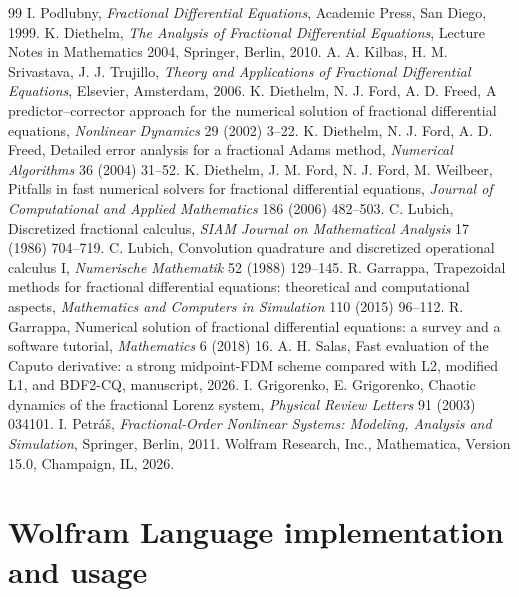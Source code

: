 \documentclass[11pt]{article}
\begin{document}
\begin{thebibliography}{99}
 I. Podlubny, \emph{Fractional Differential Equations}, Academic Press, San Diego, 1999.
 K. Diethelm, \emph{The Analysis of Fractional Differential Equations}, Lecture Notes in Mathematics 2004, Springer, Berlin, 2010.
 A. A. Kilbas, H. M. Srivastava, J. J. Trujillo, \emph{Theory and Applications of Fractional Differential Equations}, Elsevier, Amsterdam, 2006.
 K. Diethelm, N. J. Ford, A. D. Freed, A predictor--corrector approach for the numerical solution of fractional differential equations, \emph{Nonlinear Dynamics} 29 (2002) 3--22.
 K. Diethelm, N. J. Ford, A. D. Freed, Detailed error analysis for a fractional Adams method, \emph{Numerical Algorithms} 36 (2004) 31--52.
 K. Diethelm, J. M. Ford, N. J. Ford, M. Weilbeer, Pitfalls in fast numerical solvers for fractional differential equations, \emph{Journal of Computational and Applied Mathematics} 186 (2006) 482--503.
 C. Lubich, Discretized fractional calculus, \emph{SIAM Journal on Mathematical Analysis} 17 (1986) 704--719.
 C. Lubich, Convolution quadrature and discretized operational calculus I, \emph{Numerische Mathematik} 52 (1988) 129--145.
 R. Garrappa, Trapezoidal methods for fractional differential equations: theoretical and computational aspects, \emph{Mathematics and Computers in Simulation} 110 (2015) 96--112.
 R. Garrappa, Numerical solution of fractional differential equations: a survey and a software tutorial, \emph{Mathematics} 6 (2018) 16.
 A. H. Salas, Fast evaluation of the Caputo derivative: a strong midpoint-FDM scheme compared with L2, modified L1, and BDF2-CQ, manuscript, 2026.
 I. Grigorenko, E. Grigorenko, Chaotic dynamics of the fractional Lorenz system, \emph{Physical Review Letters} 91 (2003) 034101.
 I. Petr\'a\v{s}, \emph{Fractional-Order Nonlinear Systems: Modeling, Analysis and Simulation}, Springer, Berlin, 2011.
 Wolfram Research, Inc., Mathematica, Version 15.0, Champaign, IL, 2026.
\end{thebibliography}

\clearpage
\appendix
\nolinenumbers
\section{Wolfram Language implementation and usage}\label{app:wl}
\end{document}
